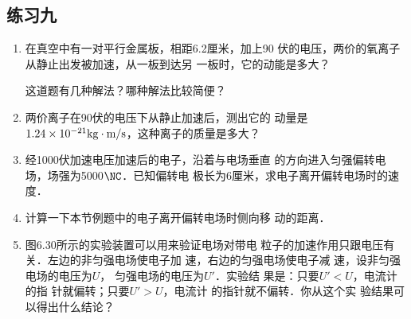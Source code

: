 \subsection{练习九}
\begin{enumerate}
	\item 在真空中有一对平行金属板，相距6.2厘米，加上90
伏的电压，两价的氧离子从静止出发被加速，从一板到达另
一板时，它的动能是多大？

这道题有几种解法？哪种解法比较简便？

\item 两价离子在90伏的电压下从静止加速后，测出它的
动量是$1.24\times10^{-21}{\rm kg}\cdot \text{m}/\text{s}$，这种离子的质量是多大？

\item 经1000伏加速电压加速后的电子，沿着与电场垂直
的方向进入匀强偏转电场，场强为5000$\NC$．已知偏转电
极长为6厘米，求电子离开偏转电场时的速度．
\item 计算一下本节例题中的电子离开偏转电场时侧向移
动的距离．
\item 图6.30所示的实验装置可以用来验证电场对带电
粒子的加速作用只跟电压有关．左边的非匀强电场使电子加
速，右边的匀强电场使电子减
速，设非匀强电场的电压为$U$，
匀强电场的电压为$U'$．实验结
果是：只要$U'<U$，电流计的指
针就偏转；只要$U'>U$，电流计
的指针就不偏转．你从这个实
验结果可以得出什么结论？
\begin{figure}[htp]\centering
	\caption{}
	\end{figure}
\end{enumerate}



